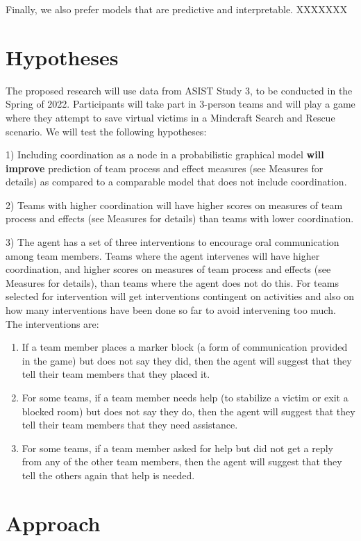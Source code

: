 Finally, we also prefer models that are predictive and interpretable. XXXXXXX

\section{Hypotheses}
The proposed research will use data from ASIST Study 3, to be conducted in the Spring of 2022. Participants will take part in 3-person teams and will play a game where they attempt to save virtual victims in a Mindcraft Search and Rescue scenario. We will test the following hypotheses:

1) Including coordination as a node in a probabilistic graphical model
\textbf{will improve} prediction of team process and effect measures (see Measures for details)  as compared to a comparable model that does not include coordination.

2) Teams with higher coordination will have higher scores on measures of team process and effects (see Measures for details) than teams with lower coordination.

3) The agent has a set of three interventions to encourage oral communication among
team members. Teams where the agent intervenes will have higher coordination,
and higher scores on measures of team process and effects (see Measures for
details), than teams where the agent does not do this. For teams selected for
intervention will get interventions contingent on activities and also on how
many interventions have been done so far to avoid intervening too much.  The
interventions are:
\begin{enumerate}
    \item
    If a team member places a marker block (a form of communication provided in
    the game) but does not say they did, then the agent will suggest that they
    tell their team members that they placed it. 
    \item
    For some teams, if a team member needs help (to stabilize a victim or exit a
    blocked room) but does not say they do, then the agent will suggest that
    they tell their team members that they need assistance. 
    \item
    For some teams, if a team member asked for help but did not get a reply from
    any of the other team members, then the agent will suggest that they tell
    the others again that help is needed. 
\end{enumerate}

\section{Approach}

